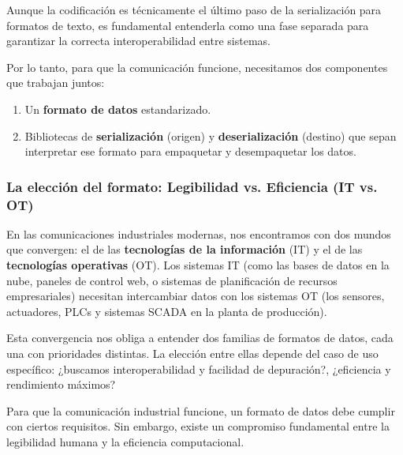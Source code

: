 Aunque la codificación es técnicamente el último paso de la serialización para formatos de texto, es fundamental entenderla como una fase separada para garantizar la correcta interoperabilidad entre sistemas.

Por lo tanto, para que la comunicación funcione, necesitamos dos componentes que trabajan juntos:
\begin{enumerate}
    \item Un \textbf{formato de datos} estandarizado.
    \item Bibliotecas de \textbf{serialización} (origen) y \textbf{deserialización} (destino) que sepan interpretar ese formato para empaquetar y desempaquetar los datos.
\end{enumerate}


\subsubsection{La elección del formato: Legibilidad vs. Eficiencia (IT vs. OT)}
En las comunicaciones industriales modernas, nos encontramos con dos mundos que convergen: el de las \textbf{tecnologías de la información} (IT) y el de las \textbf{tecnologías operativas} (OT). Los sistemas IT (como las bases de datos en la nube, paneles de control web, o sistemas de planificación de recursos empresariales) necesitan intercambiar datos con los sistemas OT (los sensores, actuadores, PLCs y sistemas SCADA en la planta de producción).

Esta convergencia nos obliga a entender dos familias de formatos de datos, cada una con prioridades distintas. La elección entre ellas depende del caso de uso específico: ¿buscamos interoperabilidad y facilidad de depuración?, ¿eficiencia y rendimiento máximos?

Para que la comunicación industrial funcione, un formato de datos debe cumplir con ciertos requisitos. Sin embargo, existe un compromiso fundamental entre la legibilidad humana y la eficiencia computacional.

